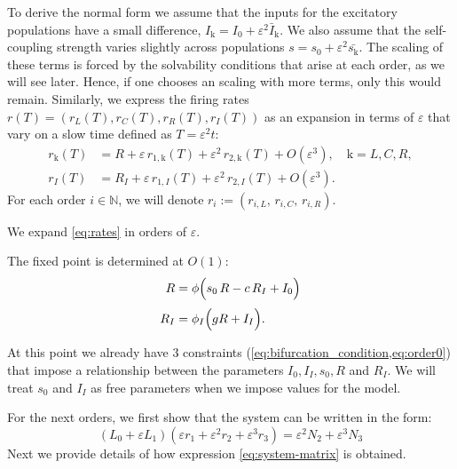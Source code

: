 \documentclass[12,twoside]{TFG-GM}
\theoremstyle{definition}
\theoremstyle{remark}
\newcommand{\kk}{\mathrm{k}}
\begin{document}
To derive the normal form we assume that the inputs for the excitatory populations have a small difference,  $I_\kk  = I_0 + \varepsilon^2\bar{I}_\kk $. We also assume that the self-coupling strength varies slightly across populations $s = s_0 +\varepsilon^2 \bar{s_\kk}$. The scaling of these terms is forced by the solvability conditions that arise at each order, as we will see later. Hence, if one chooses an scaling with more terms, only this would remain. 
Similarly, we express the firing rates  $r(T) = (r_L(T),r_C(T),r_R(T), r_I(T))$ as an expansion in terms of $\varepsilon$ that vary on a slow time defined as $T = \varepsilon^2 t$:
\begin{subequations}
\label{eq:exp}
\begin{align}
  r_\kk (T) &= R + \varepsilon\,r_{1,\kk }(T) + \varepsilon^2\,r_{2,\kk }(T) + O(\varepsilon^3), \quad \kk =L,C,R, \label{eq:exp_ex}\\[1mm]
  r_I(T) &= R_I + \varepsilon\,r_{1,I}(T) + \varepsilon^2\,r_{2,I}(T) + O(\varepsilon^3). \label{eq:exp_inh}
\end{align}
\end{subequations}
For each order $i \in \mathbb{N}$, we will denote $r_i := (r_{i,L},\, r_{i,C},\,r_{i,R})$.

We expand \eqref{eq:rates} in orders of $\varepsilon$.

The fixed point is determined at \(O(1)\):
\begin{equation}
\begin{aligned}
  R &= \phi\Bigl(s_0\,R - c\,R_I + I_0  \Bigr)
  \\[1mm]
  R_I &= \phi_I\Bigl({g}R+I_I\Bigr). \label{eq:order0}
\end{aligned}
\end{equation}

At this point we already have 3 constraints (\cref{eq:bifurcation_condition,eq:order0}) that impose a relationship between the parameters $I_0, I_I, s_0, R$ and $R_I$.
We will treat $s_0$ and $I_I$ as free parameters when we impose values for the model.
\bigskip

For the next orders, we first show that the system can be written in the form:
\begin{equation}
(L_0 + \varepsilon L_1)(\varepsilon r_1 + \varepsilon^2 r_2 + \varepsilon^3 r_3) = \varepsilon^2N_2 + \varepsilon^3N_3
\label{eq:system-matrix}
\end{equation}
Next we provide details of how expression \eqref{eq:system-matrix} is obtained.
\end{document}
